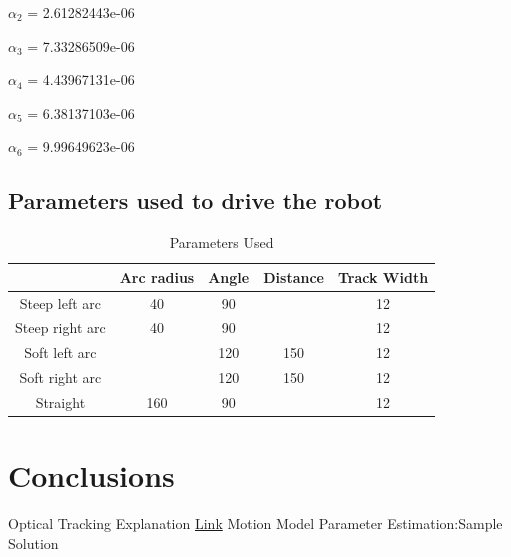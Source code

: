 \documentclass[10pt]{scrartcl}
\begin{document}
$\alpha_2$ =  2.61282443e-06

$\alpha_3$ =  7.33286509e-06

$\alpha_4$ =  4.43967131e-06

$\alpha_5$ =  6.38137103e-06

$\alpha_6$ =  9.99649623e-06
        
      
\subsection*{Parameters used to drive the robot}

\begin{table}[ht]
\centering
\caption{Parameters Used}
\label{tab:1}
\begin{tabular}{|c|c|c|c|c|} \hline
 				& Arc radius& Angle & Distance & Track Width \\ \hline
Steep left arc  & 40        & 90    &          & 12 \\ \hline
Steep right arc & 40        & 90    &          & 12 \\ \hline
Soft left arc   &           & 120    & 150       & 12 \\ \hline
Soft right arc  &           & 120    & 150       & 12 \\ \hline
Straight        & 160        & 90    &          & 12 \\ \hline
 
\end{tabular}
\end{table}


\section*{Conclusions}


\begin{thebibliography}{1}
 Optical Tracking Explanation \href{http://www.ps-tech.com/3d-technology/optical-tracking}{Link}
 Motion Model Parameter Estimation:Sample Solution
\end{thebibliography}
\end{document}
